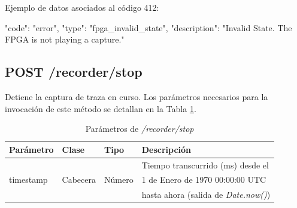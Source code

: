 \begin{itemize}
{\begin{minipage}{\textwidth}
Ejemplo de datos asociados al código 412:

\begin{code}[language=json]
{
  "code": "error",
  "type": "fpga_invalid_state",
  "description": "Invalid State. The FPGA is not playing a capture."
}
\end{code}
\end{minipage}
}

\end{itemize}

%
%
\subsection{POST /recorder/stop}
Detiene la captura de \gls{traza} en curso. Los parámetros necesarios para la invocación de este método se detallan en la Tabla \ref{extra:api:recorderstop:invocacion}.

\begin{table}[H]
\centering
\begin{tabular}{|l|l|l|l|}
\hline
\rowcolor[HTML]{F5F5F5}
\textbf{Parámetro}  & \textbf{Clase} & \textbf{Tipo}   & \textbf{Descripción}                         \\ \hline
                    &                &                 & Tiempo transcurrido (ms) desde el            \\
timestamp           & Cabecera       & Número          & 1 de Enero de 1970 00:00:00 UTC              \\
                    &                &                 & hasta ahora (salida de \textit{Date.now()})  \\ \hline
\end{tabular}
\caption{Parámetros de \textit{/recorder/stop}}
\label{extra:api:recorderstop:invocacion}
\end{table}

